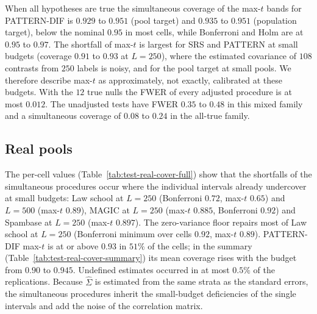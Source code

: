 When all hypotheses are true the simultaneous coverage of the max-$t$ bands for PATTERN-DIF is $0.929$ to $0.951$ (pool target) and $0.935$ to $0.951$ (population target), below the nominal $0.95$ in most cells, while Bonferroni and Holm are at $0.95$ to $0.97$. The shortfall of max-$t$ is largest for SRS and PATTERN at small budgets (coverage $0.91$ to $0.93$ at $L=250$), where the estimated covariance of $108$ contrasts from $250$ labels is noisy, and for the pool target at small pools. We therefore describe max-$t$ as approximately, not exactly, calibrated at these budgets. With the $12$ true nulls the FWER of every adjusted procedure is at most $0.012$. The unadjusted tests have FWER $0.35$ to $0.48$ in this mixed family and a simultaneous coverage of $0.08$ to $0.24$ in the all-true family.

\subsection{Real pools}

\begin{table}[p]
\centering\small
\caption{Simultaneous coverage of the $K$ live pool contrasts at familywise level $0.05$ ($R=400$ per row; Monte Carlo standard error about $0.011$ at $0.95$). PATTERN-DIF without floor; Max-$t$ (floor) uses the zero-variance floor of \texttt{tcs.labeling\_dif}. Bonferroni and Holm coincide when every hypothesis is true. $c_{\max t}/c_{\rm Bonf}$: mean max-$t$ critical value over the Bonferroni value.}\label{tab:test-real-cover-full}

\end{table}

\begin{table}[p]
\centering\small
\caption{Simultaneous coverage of the family of pool contrasts on the eleven real pools, mean and minimum over setting--budget cells at the budget $L$.}\label{tab:test-real-cover-summary}

\end{table}

The per-cell values (Table~\ref{tab:test-real-cover-full}) show that the shortfalls of the simultaneous procedures occur where the individual intervals already undercover at small budgets: Law school at $L=250$ (Bonferroni $0.72$, max-$t$ $0.65$) and $L=500$ (max-$t$ $0.89$), MAGIC at $L=250$ (max-$t$ $0.885$, Bonferroni $0.92$) and Spambase at $L=250$ (max-$t$ $0.897$). The zero-variance floor repairs most of Law school at $L=250$ (Bonferroni minimum over cells $0.92$, max-$t$ $0.89$). PATTERN-DIF max-$t$ is at or above $0.93$ in $51\%$ of the cells; in the summary (Table~\ref{tab:test-real-cover-summary}) its mean coverage rises with the budget from $0.90$ to $0.945$. Undefined estimates occurred in at most $0.5\%$ of the replications. Because $\hat\Sigma$ is estimated from the same strata as the standard errors, the simultaneous procedures inherit the small-budget deficiencies of the single intervals and add the noise of the correlation matrix.

